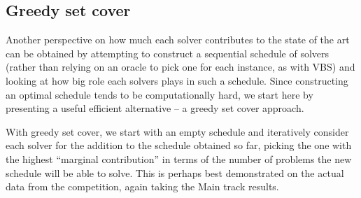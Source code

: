 \documentclass{elsarticle}
\begin{document}
\subsection{Greedy set cover}
Another perspective on how much each solver contributes to the state of the art
can be obtained by attempting to construct a sequential schedule of solvers 
(rather than relying on an oracle to pick one for each instance, as with VBS)
and looking at how big role each solvers plays in such a schedule. Since constructing 
an optimal schedule tends to be computationally hard, we start here by 
presenting a useful efficient alternative -- a greedy set cover approach.

With greedy set cover, we start with an empty schedule and iteratively consider 
each solver for the addition to the schedule obtained so far, picking the one
with the highest ``marginal contribution'' in terms of the number of problems
the new schedule will be able to solve. This is perhaps best demonstrated on
the actual data from the competition, again taking the Main track results. 
\end{document}
